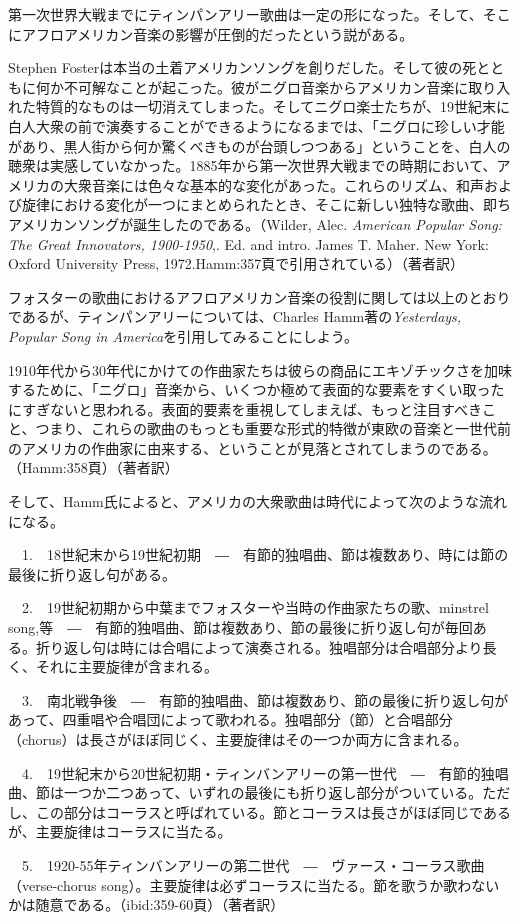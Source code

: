 第一次世界大戦までにティンパンアリー歌曲は一定の形になった。そして、そこにアフロアメリカン音楽の影響が圧倒的だったという説がある。

\begin{gquote}
Stephen Fosterは本当の土着アメリカンソングを創りだした。そして彼の死とともに何か不可解なことが起こった。彼がニグロ音楽からアメリカン音楽に取り入れた特質的なものは一切消えてしまった。そしてニグロ楽士たちが、19世紀末に白人大衆の前で演奏することができるようになるまでは、「ニグロに珍しい才能があり、黒人街から何か驚くべきものが台頭しつつある」ということを、白人の聴衆は実感していなかった。1885年から第一次世界大戦までの時期において、アメリカの大衆音楽には色々な基本的な変化があった。これらのリズム、和声および旋律における変化が一つにまとめられたとき、そこに新しい独特な歌曲、即ちアメリカンソングが誕生したのである。（Wilder, Alec. \textit{American Popular Song: The Great Innovators, 1900-1950},. Ed. and intro. James T. Maher. New York: Oxford University Press, 1972.Hamm:357頁で引用されている）（著者訳）
\end{gquote}

フォスターの歌曲におけるアフロアメリカン音楽の役割に関しては以上のとおりであるが、ティンパンアリーについては、Charles Hamm著の\textit{Yesterdays, Popular Song in America}を引用してみることにしよう。

\begin{gquote}
1910年代から30年代にかけての作曲家たちは彼らの商品にエキゾチックさを加味するために、「ニグロ」音楽から、いくつか極めて表面的な要素をすくい取ったにすぎないと思われる。表面的要素を重視してしまえば、もっと注目すべきこと、つまり、これらの歌曲のもっとも重要な形式的特徴が東欧の音楽と一世代前のアメリカの作曲家に由来する、ということが見落とされてしまうのである。（Hamm:358頁）（著者訳）
\end{gquote}

そして、Hamm氏によると、アメリカの大衆歌曲は時代によって次のような流れになる。

\begin{gquote}
　1.　18世紀末から19世紀初期　―　有節的独唱曲、節は複数あり、時には節の最後に折り返し句がある。\par{}　2.　19世紀初期から中葉までフォスターや当時の作曲家たちの歌、minstrel song,等　―　有節的独唱曲、節は複数あり、節の最後に折り返し句が毎回ある。折り返し句は時には合唱によって演奏される。独唱部分は合唱部分より長く、それに主要旋律が含まれる。\par{}　3.　南北戦争後　―　有節的独唱曲、節は複数あり、節の最後に折り返し句があって、四重唱や合唱団によって歌われる。独唱部分（節）と合唱部分（chorus）は長さがほぼ同じく、主要旋律はその一つか両方に含まれる。\par{}　4.　19世紀末から20世紀初期・ティンバンアリーの第一世代　―　有節的独唱曲、節は一つか二つあって、いずれの最後にも折り返し部分がついている。ただし、この部分はコーラスと呼ばれている。節とコーラスは長さがほぼ同じであるが、主要旋律はコーラスに当たる。\par{}　5.　1920-55年ティンバンアリーの第二世代　―　ヴァース・コーラス歌曲（verse-chorus song）。主要旋律は必ずコーラスに当たる。節を歌うか歌わないかは随意である。（ibid:359-60頁）（著者訳）
\end{gquote}

